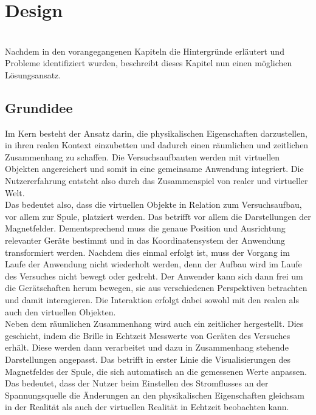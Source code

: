 \section{Design}
\label{sec-4}
\\

Nachdem in den vorangegangenen Kapiteln die Hintergründe erläutert und Probleme identifiziert wurden, beschreibt dieses Kapitel nun einen möglichen Lösungsansatz.

\subsection{Grundidee}
Im Kern besteht der Ansatz darin, die physikalischen Eigenschaften darzustellen, in ihren realen Kontext einzubetten und dadurch einen räumlichen und zeitlichen Zusammenhang zu schaffen. Die Versuchsaufbauten werden mit virtuellen Objekten angereichert und somit in eine gemeinsame Anwendung integriert. Die Nutzererfahrung entsteht also durch das Zusammenspiel von realer und virtueller Welt.\\

Das bedeutet also, dass die virtuellen Objekte in Relation zum Versuchsaufbau, vor allem zur Spule, platziert werden. Das betrifft vor allem die Darstellungen der Magnetfelder. Dementsprechend muss die genaue Position und Ausrichtung relevanter Geräte bestimmt und in das Koordinatensystem der Anwendung transformiert werden. Nachdem dies einmal erfolgt ist, muss der Vorgang im Laufe der Anwendung nicht wiederholt werden, denn der Aufbau wird im Laufe des Versuches nicht bewegt oder gedreht. Der Anwender kann sich dann frei um die Gerätschaften herum bewegen, sie aus verschiedenen Perspektiven betrachten und damit interagieren. Die Interaktion erfolgt dabei sowohl mit den realen als auch den virtuellen Objekten.\\

Neben dem räumlichen Zusammenhang wird auch ein zeitlicher hergestellt. Dies geschieht, indem die Brille in Echtzeit Messwerte von Geräten des Versuches erhält. Diese werden dann verarbeitet und dazu in Zusammenhang stehende Darstellungen angepasst. Das betrifft in erster Linie die Visualisierungen des Magnetfeldes der Spule, die sich automatisch an die gemessenen Werte anpassen. Das bedeutet, dass der Nutzer beim Einstellen des Stromflusses an der Spannungsquelle die Änderungen an den physikalischen Eigenschaften gleichsam in der Realität als auch der virtuellen Realität in Echtzeit beobachten kann. \\

